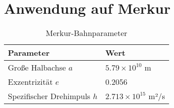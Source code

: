 \section{Anwendung auf Merkur}

\begin{table}[H]
    \centering
    \begin{tabular}{ll}
        \toprule
        Parameter & Wert \\
        \midrule
        Große Halbachse \( a \) & \(5.79 \times 10^{10}\) m \\
        Exzentrizität \( e \) & 0.2056 \\
        Spezifischer Drehimpuls \( h \) & \(2.713 \times 10^{15}\) m²/s \\
        \bottomrule
    \end{tabular}
    \caption{Merkur-Bahnparameter}
\end{table}

